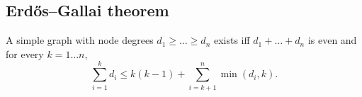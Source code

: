 	\subsection{Erdős–Gallai theorem}
		A simple graph with node degrees $d_1 \ge \dots \ge d_n$ exists iff $d_1 + \dots + d_n$ is even and for every $k = 1\dots n$,
		\[ \sum _{i=1}^{k}d_{i}\leq k(k-1)+\sum _{i=k+1}^{n}\min(d_{i},k). \]